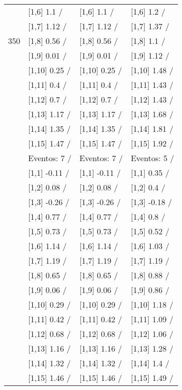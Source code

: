 \begin{table}
\begin{tabular}[t]{llll}
 & {}[1,6] 1.1  / & {}[1,6] 1.1  / & {}[1,6] 1.2  /\\
 & {}[1,7] 1.12  / & {}[1,7] 1.12  / & {}[1,7] 1.37  /\\
350 & {}[1,8] 0.56  / & {}[1,8] 0.56  / & {}[1,8] 1.1  /\\
\addlinespace
 & {}[1,9] 0.01  / & {}[1,9] 0.01  / & {}[1,9] 1.12  /\\
 & {}[1,10] 0.25  / & {}[1,10] 0.25  / & {}[1,10] 1.48  /\\
 & {}[1,11] 0.4  / & {}[1,11] 0.4  / & {}[1,11] 1.43  /\\
 & {}[1,12] 0.7  / & {}[1,12] 0.7  / & {}[1,12] 1.43  /\\
 & {}[1,13] 1.17  / & {}[1,13] 1.17  / & {}[1,13] 1.68  /\\
\addlinespace
 & {}[1,14] 1.35  / & {}[1,14] 1.35  / & {}[1,14] 1.81  /\\
 & {}[1,15] 1.47  / & {}[1,15] 1.47  / & {}[1,15] 1.92  /\\
 & Eventos:  7 / & Eventos:  7 / & Eventos:  5 /\\
 & {}[1,1] -0.11  / & {}[1,1] -0.11  / & {}[1,1] 0.35  /\\
 & {}[1,2] 0.08  / & {}[1,2] 0.08  / & {}[1,2] 0.4  /\\
\addlinespace
 & {}[1,3] -0.26  / & {}[1,3] -0.26  / & {}[1,3] -0.18  /\\
 & {}[1,4] 0.77  / & {}[1,4] 0.77  / & {}[1,4] 0.8  /\\
 & {}[1,5] 0.73  / & {}[1,5] 0.73  / & {}[1,5] 0.52  /\\
 & {}[1,6] 1.14  / & {}[1,6] 1.14  / & {}[1,6] 1.03  /\\
 & {}[1,7] 1.19  / & {}[1,7] 1.19  / & {}[1,7] 1.19  /\\
\addlinespace
500 & {}[1,8] 0.65  / & {}[1,8] 0.65  / & {}[1,8] 0.88  /\\
 & {}[1,9] 0.06  / & {}[1,9] 0.06  / & {}[1,9] 0.86  /\\
 & {}[1,10] 0.29  / & {}[1,10] 0.29  / & {}[1,10] 1.18  /\\
 & {}[1,11] 0.42  / & {}[1,11] 0.42  / & {}[1,11] 1.09  /\\
 & {}[1,12] 0.68  / & {}[1,12] 0.68  / & {}[1,12] 1.06  /\\
\addlinespace
 & {}[1,13] 1.16  / & {}[1,13] 1.16  / & {}[1,13] 1.28  /\\
 & {}[1,14] 1.32  / & {}[1,14] 1.32  / & {}[1,14] 1.4  /\\
 & {}[1,15] 1.46  / & {}[1,15] 1.46  / & {}[1,15] 1.49  /\\
\bottomrule
\end{tabular}
\end{table}
